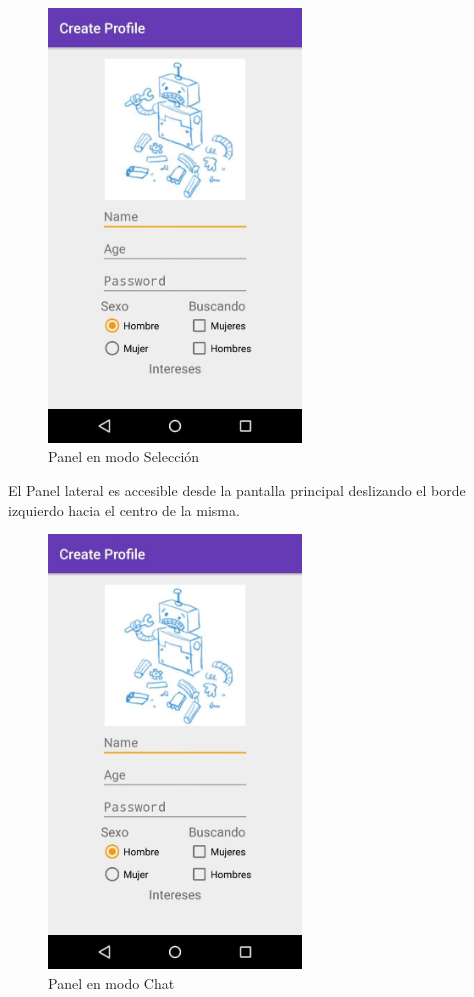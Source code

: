 \documentclass[10pt,letterpaper,extrafontsizes]{memoir}
\begin{document}
\begin{figure}[H]
    \centering
\includegraphics[width=0.6\textwidth]{graficos/capturas/i}
    \caption{Panel en modo Selección}
    \label{fig:panel1}
\end{figure}

El Panel lateral es accesible desde la pantalla principal deslizando el borde izquierdo hacia el centro de la misma.

\begin{figure}[H]
    \centering
\includegraphics[width=0.6\textwidth]{graficos/capturas/i}
    \caption{Panel en modo Chat}
    \label{fig:panle2}
\end{figure}
\end{document}
